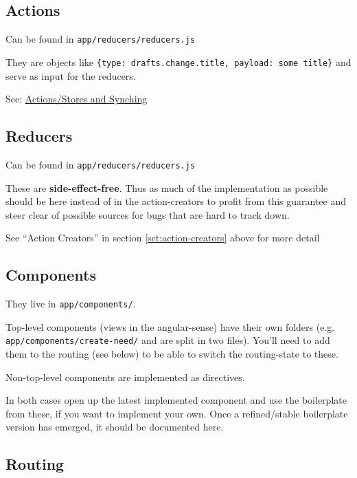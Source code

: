 \subsection{Actions}\label{actions}

Can be found in \texttt{app/reducers/reducers.js} %

They are objects like
\texttt{\{type:\ \textquotesingle{}drafts.change.title\textquotesingle{},\ payload:\ \textquotesingle{}some\ title\textquotesingle{}\}}
and serve as input for the reducers.

See:
\href{https://github.com/researchstudio-sat/webofneeds/issues/342}{Actions/Stores
and Synching} %

\subsection{Reducers}\label{reducers}

Can be found in \texttt{app/reducers/reducers.js} %

These are \textbf{side-effect-free}. Thus as much of the implementation
as possible should be here instead of in the action-creators
to profit from this guarantee and steer clear of possible sources for
bugs that are hard to track down.

See ``Action Creators'' in section \ref{sct:action-creators} above for more detail

\subsection{Components}\label{components}

They live in \texttt{app/components/}. %

Top-level components (views in the angular-sense) have their own folders
(e.g. \texttt{app/components/create-need/} and are split in two files).
You'll need to add them to the routing (see below) to be able to switch
the routing-state to these.

Non-top-level components are implemented as directives.

In both cases open up the latest implemented component and use the
boilerplate from these, if you want to implement your own. Once a
refined/stable boilerplate version has emerged, it should be documented
here.

\subsection{Routing}\label{routing}

